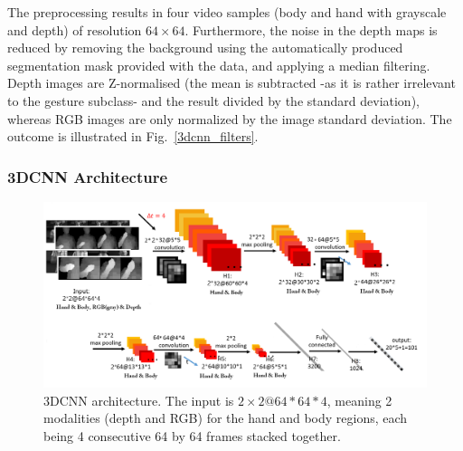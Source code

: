 The preprocessing results in four video samples (body and hand with grayscale and depth) of resolution $64\times64$.
Furthermore, the noise in the depth maps is reduced by removing the background using the automatically produced
segmentation mask provided with the data, and applying a  median filtering.
%
Depth images are Z-normalised (the mean is subtracted -as it is rather irrelevant to the gesture subclass-
and the result divided by the standard deviation), whereas
RGB images are only normalized by the image standard deviation.
The outcome is illustrated in Fig.~\ref{3dcnn_filters}.


\subsubsection{3DCNN Architecture}
\begin{figure}[t]
  \centering
  \includegraphics[width=.9\textwidth]{images/3DCNN_new}
\vspace*{-2mm}
  \caption{3DCNN architecture. The input is $2\times2@64\ast64\ast4$, meaning 2 modalities (depth and RGB)  for the hand and body regions,
each  being 4  consecutive 64 by 64 frames stacked together.
%
}
\label{3dcnn_architecture}
\end{figure}

